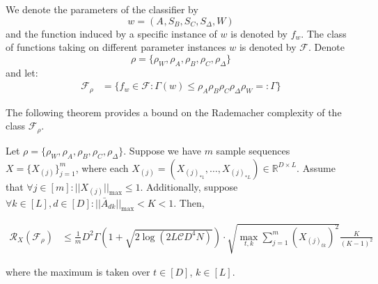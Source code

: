We denote the parameters of the classifier by 
\[
w = (A^{}, S_B^{}, S_C^{}, S_{\Delta}^{}, W) 
\] and the function induced by a specific instance of $w$ is denoted by $f_w$. The class of functions taking on different parameter instances $w$ is denoted by $\mathcal{F}$.
Denote 
\[
\rho = \{\rho_W, \rho_A, \rho_B, \rho_C, \rho_{\Delta}\}
\]
and let:
\begin{equation}
\begin{aligned}
   \mathcal{F}_{\rho} 
    &=\{f_w \in \mathcal{F} : \Gamma(w) \leq  \rho_A \rho_B \rho_C \rho_{\Delta} \rho_W=:\Gamma \}
\end{aligned}
\end{equation}

The following theorem provides a bound on the Rademacher complexity of the class $\mathcal{F}_{\rho}$.
\setcounter{section}{2}
\setcounter{theorem}{3}
\begin{theorem}\label{theorem:rad}
Let $\rho = \{\rho_W, \rho_A, \rho_B, \rho_C, \rho_{\Delta}\}$. Suppose we have \(m\) sample sequences \(X = \{ X_{(j)} \}_{j=1}^{m}\), where each \(X_{(j)} = (X_{(j)_{*1}}, \ldots, X_{(j)_{*L}}) \in \mathbb{R}^{D \times L}\). Assume that $\forall j \in [m]: ||X_{(j)}||_{\max} \leq 1$. Additionally, suppose $\forall k \in [L], d \in [D]:||\bar{A}^{}_{dk}||_{\max} < K < 1$. Then,
\begin{small}
\begin{equation*}
\begin{aligned}
\mathcal{R}_X(\mathcal{F}_{\rho})
&\leq\frac{1}{m} D^{2} \Gamma (1 + \sqrt{2\log (2L \mathcal{C} D^4 N)}) \cdot  \sqrt{\max_{t, k} \sum_{j=1}^m (X_{(j)_{tk}})^2} \frac{K}{(K-1)^2}
\end{aligned}
\end{equation*}
\end{small}
where the maximum is taken over \(t \in [D]\),  \(k \in [L]\). 
\end{theorem}

